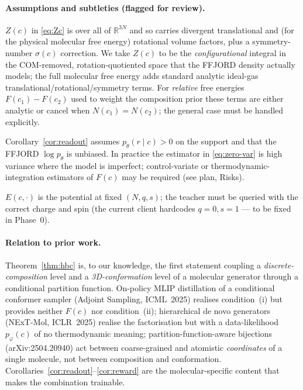 \paragraph{Assumptions and subtleties (flagged for review).}
\begin{assumption}
\label{ass:rigid}
$Z(c)$ in \eqref{eq:Zc} is over all of $\mathbb{R}^{3N}$ and so carries divergent
translational and (for the physical molecular free energy) rotational volume factors,
plus a symmetry-number $\sigma(c)$ correction. We take $Z(c)$ to be the
\emph{configurational} integral in the COM-removed, rotation-quotiented space that the
FFJORD density actually models; the full molecular free energy adds standard analytic
ideal-gas translational/rotational/symmetry terms. For \emph{relative} free energies
$F(c_1)-F(c_2)$ used to weight the composition prior these terms are either analytic or
cancel when $N(c_1)=N(c_2)$; the general case must be handled explicitly.
\end{assumption}
\begin{assumption}
Corollary~\ref{cor:readout} assumes $p_\theta(r\mid c)>0$ on the support and that the
FFJORD $\log p_\theta$ is unbiased. In practice the estimator in \eqref{eq:zero-var} is
high variance where the model is imperfect; control-variate or thermodynamic-integration
estimators of $F(c)$ may be required (see plan, Risks).
\end{assumption}
\begin{assumption}
$E(c,\cdot)$ is the potential at fixed $(N,q,s)$; the teacher must be queried with the
correct charge and spin (the current client hardcodes $q{=}0,s{=}1$ — to be fixed in
Phase~0).
\end{assumption}

\paragraph{Relation to prior work.}
Theorem~\ref{thm:hbc} is, to our knowledge, the first statement coupling a
\emph{discrete-composition} level and a \emph{3D-conformation} level of a molecular
generator through a conditional partition function. On-policy MLIP distillation of a
conditional conformer sampler (Adjoint Sampling, ICML~2025) realises condition~(i) but
provides neither $F(c)$ nor condition~(ii); hierarchical de novo generators (NExT-Mol,
ICLR~2025) realise the factorisation but with a data-likelihood $p_\varphi(c)$ of no
thermodynamic meaning; partition-function-aware bijections (arXiv:2504.20940) act between
coarse-grained and atomistic \emph{coordinates} of a single molecule, not between
composition and conformation. Corollaries~\ref{cor:readout}--\ref{cor:reward} are the
molecular-specific content that makes the combination trainable.
